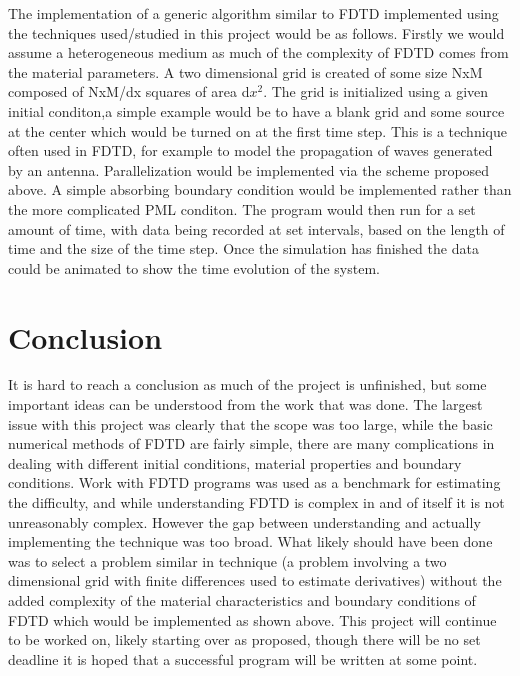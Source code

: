 \documentclass{article}
\begin{document}
The implementation of a generic algorithm similar to FDTD implemented using the
techniques used/studied in this project would be as follows. Firstly we would
assume a heterogeneous medium as much of the complexity of FDTD comes from the
material parameters. A two dimensional grid is created of some size NxM
composed of NxM/dx squares of area d\(x^2\). The grid is initialized using a
given initial conditon,a simple example would be to have a blank grid and some
source at the center which would be turned on at the first time step. This is a
technique often used in FDTD, for example to model the propagation of waves
generated by an antenna. Parallelization would be implemented via the scheme
proposed above. A simple absorbing boundary condition would be implemented
rather than the more complicated PML conditon. The program would then run for a
set amount of time, with data being recorded at set intervals, based on the
length of time and the size of the time step. Once the simulation has finished
the data could be animated to show the time evolution of the system.
\section{Conclusion}
It is hard to reach a conclusion as much of the project is unfinished, but some
important ideas can be understood from the work that was done. The largest
issue with this project was clearly that the scope was too large, while the
basic numerical methods of FDTD are fairly simple, there are many complications
in dealing with different initial conditions, material properties and boundary
conditions. Work with FDTD programs was used as a benchmark for estimating the
difficulty, and while understanding FDTD is complex in and of itself it is not
unreasonably complex. However the gap between understanding and actually
implementing the technique was too broad. What likely should have been done was
to select a problem similar in technique (a problem involving a two dimensional
grid with finite differences used to estimate derivatives) without the added
complexity of the material characteristics and boundary conditions of FDTD
which would be implemented as shown above. This project will continue to be
worked on, likely starting over as proposed, though there will be no set
deadline it is hoped that a successful program will be written at some point.
\end{document}
